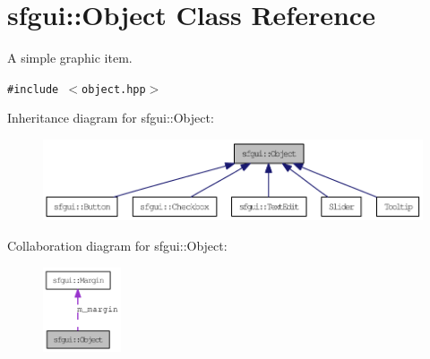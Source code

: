 \hypertarget{classsfgui_1_1Object}{
\section{sfgui::Object Class Reference}
\label{classsfgui_1_1Object}
}
A simple graphic item.  


{\tt \#include $<$object.hpp$>$}

Inheritance diagram for sfgui::Object:\nopagebreak
\begin{figure}[H]
\begin{center}
\leavevmode
\includegraphics[width=400pt]{classsfgui_1_1Object__inherit__graph}
\end{center}
\end{figure}
Collaboration diagram for sfgui::Object:\nopagebreak
\begin{figure}[H]
\begin{center}
\leavevmode
\includegraphics[width=65pt]{classsfgui_1_1Object__coll__graph}
\end{center}
\end{figure}
